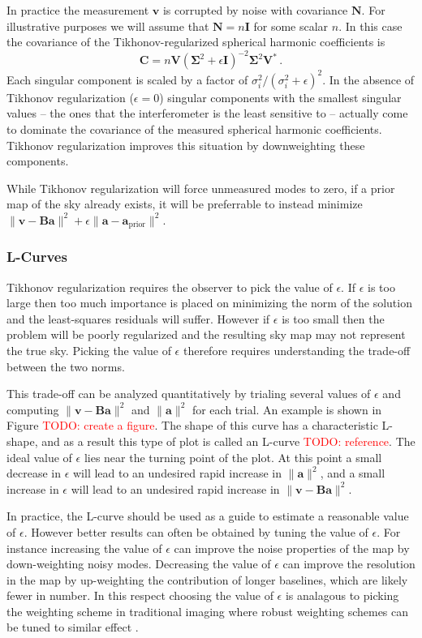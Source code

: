 \documentclass[twocolumn]{aastex6}
\renewcommand{\b}{\pmb}
\newcommand{\todo}[1]{\textcolor{red}{TODO: #1}\PackageWarning{TODO:}{#1!}}
\begin{document}
In practice the measurement $\b v$ is corrupted by noise with covariance $\b N$. For illustrative
purposes we will assume that $\b N=n\b I$ for some scalar $n$. In this case the covariance of the
Tikhonov-regularized spherical harmonic coefficients is
\begin{equation}
    \b C = n \b V (\b\Sigma^2 + \epsilon\b I)^{-2} \b\Sigma^2 \b V^*\,.
\end{equation}
Each singular component is scaled by a factor of $\sigma_i^2/(\sigma_i^2 + \epsilon)^2$.
In the absence of Tikhonov regularization ($\epsilon=0$)
singular components with the smallest singular values -- the ones that the interferometer is
the least sensitive to -- actually come to dominate the covariance of the measured spherical
harmonic coefficients. Tikhonov regularization improves this situation by downweighting these
components.

While Tikhonov regularization will force unmeasured modes to zero, if a prior map of the sky already
exists, it will be preferrable to instead minimize $\|\b v - \b B\b a\|^2 + \epsilon \|\b a-\b
a_\text{prior}\|^2$.

\subsubsection{L-Curves}

Tikhonov regularization requires the observer to pick the value of $\epsilon$. If $\epsilon$ is too
large then too much importance is placed on minimizing the norm of the solution and the
least-squares residuals will suffer. However if $\epsilon$ is too small then the problem will be
poorly regularized and the resulting sky map may not represent the true sky. Picking the value of
$\epsilon$ therefore requires understanding the trade-off between the two norms.

This trade-off can be analyzed quantitatively by trialing several values of $\epsilon$ and computing
$\|\b v - \b B\b a\|^2$ and $\|\b a\|^2$ for each trial. An example is shown in Figure \todo{create
a figure}. The shape of this curve has a characteristic L-shape, and as a result this type of plot
is called an L-curve \todo{reference}. The ideal value of $\epsilon$ lies near the turning point of
the plot. At this point a small decrease in $\epsilon$ will lead to an undesired rapid increase in
$\|\b a\|^2$, and a small increase in $\epsilon$ will lead to an undesired rapid increase in $\|\b v
- \b B\b a\|^2$.

In practice, the L-curve should be used as a guide to estimate a reasonable value of $\epsilon$.
However better results can often be obtained by tuning the value of $\epsilon$. For instance
increasing the value of $\epsilon$ can improve the noise properties of the map by down-weighting
noisy modes. Decreasing the value of $\epsilon$ can improve the resolution in the map by
up-weighting the contribution of longer baselines, which are likely fewer in number. In this respect
choosing the value of $\epsilon$ is analagous to picking the weighting scheme in traditional
imaging where robust weighting schemes can be tuned to similar effect \citep{briggs}.
\end{document}
